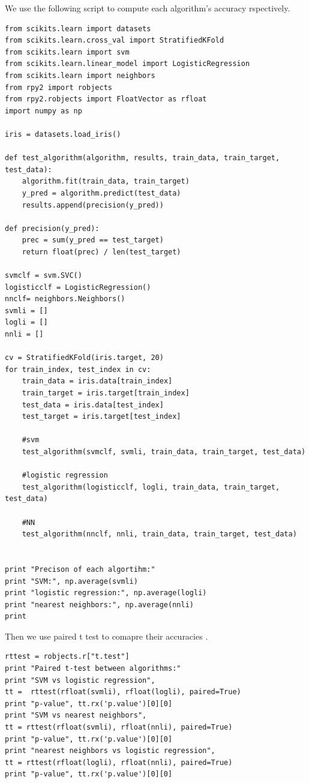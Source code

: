 \documentclass[a4paper, 11pt]{article}
\begin{document}
We use the following script to compute each algorithm's accuracy rspectively. 
\begin{verbatim}
from scikits.learn import datasets
from scikits.learn.cross_val import StratifiedKFold
from scikits.learn import svm
from scikits.learn.linear_model import LogisticRegression
from scikits.learn import neighbors
from rpy2 import robjects
from rpy2.robjects import FloatVector as rfloat
import numpy as np

iris = datasets.load_iris()

def test_algorithm(algorithm, results, train_data, train_target, test_data):
    algorithm.fit(train_data, train_target)
    y_pred = algorithm.predict(test_data)
    results.append(precision(y_pred))

def precision(y_pred):
    prec = sum(y_pred == test_target)
    return float(prec) / len(test_target)

svmclf = svm.SVC()
logisticclf = LogisticRegression()
nnclf= neighbors.Neighbors()
svmli = []
logli = []
nnli = []

cv = StratifiedKFold(iris.target, 20)
for train_index, test_index in cv:
    train_data = iris.data[train_index]
    train_target = iris.target[train_index]
    test_data = iris.data[test_index]
    test_target = iris.target[test_index]

    #svm
    test_algorithm(svmclf, svmli, train_data, train_target, test_data)

    #logistic regression
    test_algorithm(logisticclf, logli, train_data, train_target, test_data)
    
    #NN
    test_algorithm(nnclf, nnli, train_data, train_target, test_data)


print "Precison of each algortihm:"
print "SVM:", np.average(svmli)
print "logistic regression:", np.average(logli)
print "nearest neighbors:", np.average(nnli)
print
\end{verbatim}

Then we use paired t test to comapre their accuracies \cite{mitchell} \cite{r}.

\begin{verbatim}
rttest = robjects.r["t.test"]
print "Paired t-test between algorithms:"
print "SVM vs logistic regression",
tt =  rttest(rfloat(svmli), rfloat(logli), paired=True)
print "p-value", tt.rx('p.value')[0][0]
print "SVM vs nearest neighbors",
tt = rttest(rfloat(svmli), rfloat(nnli), paired=True)
print "p-value", tt.rx('p.value')[0][0]
print "nearest neighbors vs logistic regression",
tt = rttest(rfloat(logli), rfloat(nnli), paired=True)
print "p-value", tt.rx('p.value')[0][0]
\end{verbatim}
\end{document}
